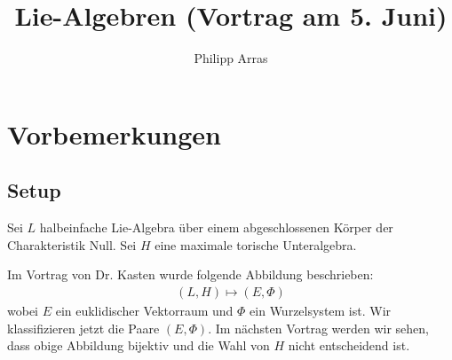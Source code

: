 \documentclass[a4paper,12pt]{article}
\title{Lie-Algebren (Vortrag am 5. Juni)}
\author{Philipp Arras}
\begin{document}
\maketitle
\setcounter{section}{-1}
\section{Vorbemerkungen}

\subsection{Setup}
Sei $L$ halbeinfache Lie-Algebra über einem abgeschlossenen Körper der Charakteristik Null. Sei $H$ eine maximale torische Unteralgebra.

Im Vortrag von Dr. Kasten wurde folgende Abbildung beschrieben:
\begin{align*}
(L,H) \mapsto (E,\Phi)
\end{align*}
wobei $E$ ein euklidischer Vektorraum und $ \Phi$ ein Wurzelsystem ist. Wir klassifizieren jetzt die Paare $(E,\Phi)$. Im nächsten Vortrag werden wir sehen, dass obige Abbildung bijektiv und die Wahl von $H$ nicht entscheidend ist. 
\end{document}
